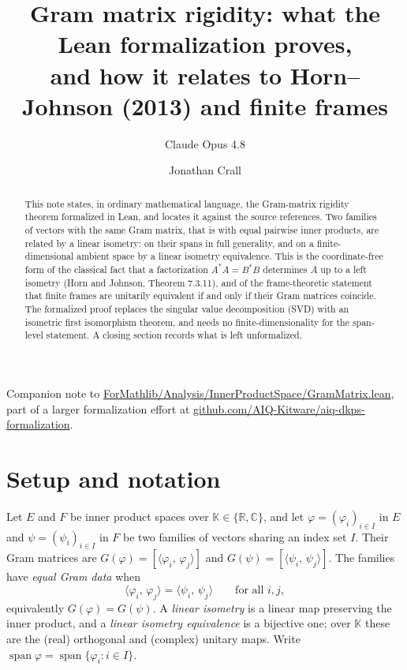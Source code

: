 \documentclass[11pt]{article}
\title{Gram matrix rigidity: what the Lean formalization proves,\\
and how it relates to Horn--Johnson (2013) and finite frames}
\author{Claude Opus 4.8 \and Jonathan Crall}
\date{}
\newcommand{\inner}[2]{\langle #1,\,#2\rangle}
\newcommand{\adj}{^{*}}
\newcommand{\KK}{\mathbb K}
\newcommand{\gram}{G}
\DeclareMathOperator{\spann}{span}
\theoremstyle{remark}
\begin{document}
\maketitle

\begin{abstract}
This note states, in ordinary mathematical language, the Gram-matrix rigidity
theorem formalized in Lean, and locates it against the source references.  Two
families of vectors with the same Gram matrix, that is with equal pairwise inner
products, are related by a linear isometry: on their spans in full generality,
and on a finite-dimensional ambient space by a linear isometry equivalence.  This
is the coordinate-free form of the classical fact that a factorization
$A\adj A=B\adj B$ determines $A$ up to a left isometry (Horn and Johnson,
Theorem 7.3.11), and of the frame-theoretic statement that finite frames are
unitarily equivalent if and only if their Gram matrices coincide.  The formalized
proof replaces the singular value decomposition (SVD) with an isometric first
isomorphism theorem, and needs no finite-dimensionality for the span-level
statement.  A closing section records what is left unformalized.
\end{abstract}

\vspace{1.5em}
\noindent Companion note to \href{https://github.com/AIQ-Kitware/aiq-dkps-formalization/blob/37d857e52be20d145cb90f29e8fe5d2a0928c3d1/ForMathlib/Analysis/InnerProductSpace/GramMatrix.lean}{ForMathlib/Analysis/InnerProductSpace/GramMatrix.lean}, part of a larger formalization effort at \href{https://github.com/AIQ-Kitware/aiq-dkps-formalization}{github.com/AIQ-Kitware/aiq-dkps-formalization}.

\section{Setup and notation}

Let $E$ and $F$ be inner product spaces over $\KK\in\{\mathbb R,\mathbb C\}$, and
let $\varphi=(\varphi_i)_{i\in I}$ in $E$ and $\psi=(\psi_i)_{i\in I}$ in $F$ be
two families of vectors sharing an index set $I$.  Their Gram matrices are
$\gram(\varphi)=[\inner{\varphi_i}{\varphi_j}]$ and
$\gram(\psi)=[\inner{\psi_i}{\psi_j}]$.  The families have \emph{equal Gram data}
when
\begin{equation}\label{eq:equalgram}
  \inner{\varphi_i}{\varphi_j}=\inner{\psi_i}{\psi_j}\qquad\text{for all }i,j,
\end{equation}
equivalently $\gram(\varphi)=\gram(\psi)$.  A \emph{linear isometry} is a linear
map preserving the inner product, and a \emph{linear isometry equivalence} is a
bijective one; over $\KK$ these are the (real) orthogonal and (complex) unitary
maps.  Write $\spann\varphi=\spann\{\varphi_i:i\in I\}$.
\end{document}
